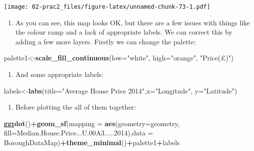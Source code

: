 \documentclass[]{book}
\newenvironment{Shaded}{\begin{snugshade}}{\end{snugshade}}
\newcommand{\DataTypeTok}[1]{\textcolor[rgb]{0.13,0.29,0.53}{#1}}
\newcommand{\DecValTok}[1]{\textcolor[rgb]{0.00,0.00,0.81}{#1}}
\newcommand{\FloatTok}[1]{\textcolor[rgb]{0.00,0.00,0.81}{#1}}
\newcommand{\KeywordTok}[1]{\textcolor[rgb]{0.13,0.29,0.53}{\textbf{#1}}}
\newcommand{\NormalTok}[1]{#1}
\newcommand{\OperatorTok}[1]{\textcolor[rgb]{0.81,0.36,0.00}{\textbf{#1}}}
\newcommand{\StringTok}[1]{\textcolor[rgb]{0.31,0.60,0.02}{#1}}
\providecommand{\tightlist}{%
  \setlength{\itemsep}{0pt}\setlength{\parskip}{0pt}}
\begin{document}
\texttt{[image: 02-prac2\_files/figure-latex/unnamed-chunk-73-1.pdf]}

\begin{enumerate}
\def\labelenumi{\arabic{enumi}.}
\setcounter{enumi}{18}
\tightlist
\item
  As you can see, this map looks OK, but there are a few issues with things like the colour ramp and a lack of appropriate labels. We can correct this by adding a few more layers. Firstly we can change the palette:
\end{enumerate}

\begin{Shaded}
\begin{Highlighting}[]
\NormalTok{palette1<-}\KeywordTok{scale_fill_continuous}\NormalTok{(}\DataTypeTok{low=}\StringTok{"white"}\NormalTok{, }\DataTypeTok{high=}\StringTok{"orange"}\NormalTok{, }\StringTok{"Price(£)"}\NormalTok{)}
\end{Highlighting}
\end{Shaded}

\begin{enumerate}
\def\labelenumi{\arabic{enumi}.}
\setcounter{enumi}{19}
\tightlist
\item
  And some appropriate labels:
\end{enumerate}

\begin{Shaded}
\begin{Highlighting}[]
\NormalTok{labels<-}\KeywordTok{labs}\NormalTok{(}\DataTypeTok{title=}\StringTok{"Average House Price 2014"}\NormalTok{,}\DataTypeTok{x=}\StringTok{"Longitude"}\NormalTok{, }\DataTypeTok{y=}\StringTok{"Latitude"}\NormalTok{)}
\end{Highlighting}
\end{Shaded}

\begin{enumerate}
\def\labelenumi{\arabic{enumi}.}
\setcounter{enumi}{20}
\tightlist
\item
  Before plotting the all of them together:
\end{enumerate}

\begin{Shaded}
\begin{Highlighting}[]
\KeywordTok{ggplot}\NormalTok{()}\OperatorTok{+}\KeywordTok{geom_sf}\NormalTok{(}\DataTypeTok{mapping =} \KeywordTok{aes}\NormalTok{(}\DataTypeTok{geometry=}\NormalTok{geometry, }\DataTypeTok{fill=}\NormalTok{Median.House.Price...U}\FloatTok{.00}\NormalTok{A3.....}\DecValTok{2014}\NormalTok{),}\DataTypeTok{data =}\NormalTok{ BoroughDataMap)}\OperatorTok{+}\KeywordTok{theme_minimal}\NormalTok{()}\OperatorTok{+}\NormalTok{palette1}\OperatorTok{+}\NormalTok{labels}
\end{Highlighting}
\end{Shaded}
\end{document}
